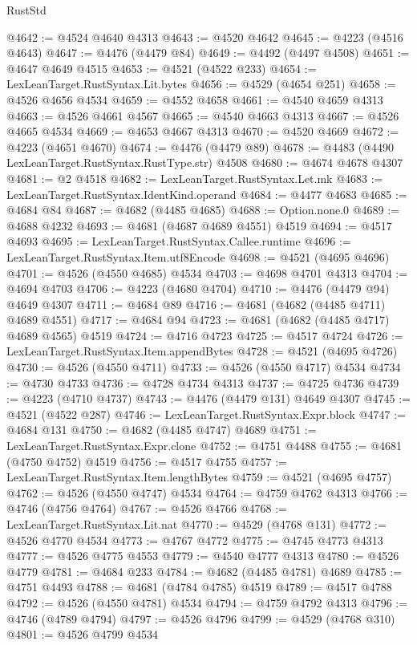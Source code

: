 \begin{lexlean}{RustStd}
\begin{coremodule}
@4642 := @4524 @4640 @4313
@4643 := @4520 @4642
@4645 := @4223 (@4516 @4643)
@4647 := @4476 (@4479 @84)
@4649 := @4492 (@4497 @4508)
@4651 := @4647 @4649 @4515
@4653 := @4521 (@4522 @233)
@4654 := LexLeanTarget.RustSyntax.Lit.bytes
@4656 := @4529 (@4654 @251)
@4658 := @4526 @4656 @4534
@4659 := @4552 @4658
@4661 := @4540 @4659 @4313
@4663 := @4526 @4661 @4567
@4665 := @4540 @4663 @4313
@4667 := @4526 @4665 @4534
@4669 := @4653 @4667 @4313
@4670 := @4520 @4669
@4672 := @4223 (@4651 @4670)
@4674 := @4476 (@4479 @89)
@4678 := @4483 (@4490 LexLeanTarget.RustSyntax.RustType.str) @4508
@4680 := @4674 @4678 @4307
@4681 := @2 @4518
@4682 := LexLeanTarget.RustSyntax.Let.mk
@4683 := LexLeanTarget.RustSyntax.IdentKind.operand
@4684 := @4477 @4683
@4685 := @4684 @84
@4687 := @4682 (@4485 @4685)
@4688 := Option.none.{0}
@4689 := @4688 @4232
@4693 := @4681 (@4687 @4689 @4551) @4519
@4694 := @4517 @4693
@4695 := LexLeanTarget.RustSyntax.Callee.runtime
@4696 := LexLeanTarget.RustSyntax.Item.utf8Encode
@4698 := @4521 (@4695 @4696)
@4701 := @4526 (@4550 @4685) @4534
@4703 := @4698 @4701 @4313
@4704 := @4694 @4703
@4706 := @4223 (@4680 @4704)
@4710 := @4476 (@4479 @94) @4649 @4307
@4711 := @4684 @89
@4716 := @4681 (@4682 (@4485 @4711) @4689 @4551)
@4717 := @4684 @94
@4723 := @4681 (@4682 (@4485 @4717) @4689 @4565) @4519
@4724 := @4716 @4723
@4725 := @4517 @4724
@4726 := LexLeanTarget.RustSyntax.Item.appendBytes
@4728 := @4521 (@4695 @4726)
@4730 := @4526 (@4550 @4711)
@4733 := @4526 (@4550 @4717) @4534
@4734 := @4730 @4733
@4736 := @4728 @4734 @4313
@4737 := @4725 @4736
@4739 := @4223 (@4710 @4737)
@4743 := @4476 (@4479 @131) @4649 @4307
@4745 := @4521 (@4522 @287)
@4746 := LexLeanTarget.RustSyntax.Expr.block
@4747 := @4684 @131
@4750 := @4682 (@4485 @4747) @4689
@4751 := LexLeanTarget.RustSyntax.Expr.clone
@4752 := @4751 @4488
@4755 := @4681 (@4750 @4752) @4519
@4756 := @4517 @4755
@4757 := LexLeanTarget.RustSyntax.Item.lengthBytes
@4759 := @4521 (@4695 @4757)
@4762 := @4526 (@4550 @4747) @4534
@4764 := @4759 @4762 @4313
@4766 := @4746 (@4756 @4764)
@4767 := @4526 @4766
@4768 := LexLeanTarget.RustSyntax.Lit.nat
@4770 := @4529 (@4768 @131)
@4772 := @4526 @4770 @4534
@4773 := @4767 @4772
@4775 := @4745 @4773 @4313
@4777 := @4526 @4775 @4553
@4779 := @4540 @4777 @4313
@4780 := @4526 @4779
@4781 := @4684 @233
@4784 := @4682 (@4485 @4781) @4689
@4785 := @4751 @4493
@4788 := @4681 (@4784 @4785) @4519
@4789 := @4517 @4788
@4792 := @4526 (@4550 @4781) @4534
@4794 := @4759 @4792 @4313
@4796 := @4746 (@4789 @4794)
@4797 := @4526 @4796
@4799 := @4529 (@4768 @310)
@4801 := @4526 @4799 @4534

\end{coremodule}
\end{lexlean}
